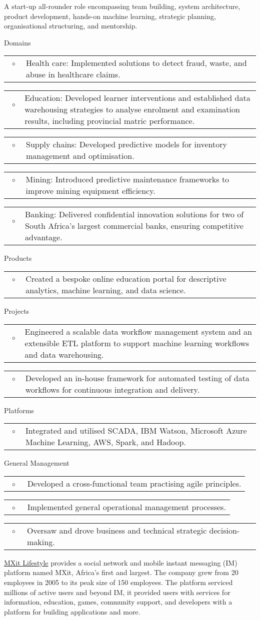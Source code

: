 \documentclass[10pt,a4paper,final]{columncv}
\makeatletter
\newcommand{\cvitembullet}[1]{%
  \begin{tabularx}{\linewidth}{@{}l@{\hspace{0.1em}}X@{}}
    ~$\circ$~ & #1 \\
  \end{tabularx}%
}
\makeatother
\begin{document}
\begin{cvenv}
         {A start-up all-rounder role encompassing team building, system architecture, product development,
          hands-on machine learning, strategic planning, organisational structuring, and mentorship.}
         {Domains
            \cvitembullet{Health care: Implemented solutions to detect fraud, waste, and abuse in healthcare claims.}
            \cvitembullet{Education: Developed learner interventions and established data warehousing strategies to analyse enrolment and examination results, including provincial matric performance.}
            \cvitembullet{Supply chains: Developed predictive models for inventory management and optimisation.}
            \cvitembullet{Mining: Introduced predictive maintenance frameworks to improve mining equipment efficiency.}
            \cvitembullet{Banking: Delivered confidential innovation solutions for two of South Africa's largest commercial banks, ensuring competitive advantage.}
          Products
            \cvitembullet{Created a bespoke online education portal for descriptive analytics, machine learning, and data science.}
          Projects
            \cvitembullet{Engineered a scalable data workflow management system and an extensible ETL platform to support machine learning workflows and data warehousing.}
            \cvitembullet{Developed an in-house framework for automated testing of data workflows for continuous integration and delivery.}
          Platforms
            \cvitembullet{Integrated and utilised SCADA, IBM Watson, Microsoft Azure Machine Learning, AWS, Spark, and Hadoop.}
          General Management
            \cvitembullet{Developed a cross-functional team practising agile principles.}
            \cvitembullet{Implemented general operational management processes.}
            \cvitembullet{Oversaw and drove business and technical strategic decision-making.}
          }
\end{cvenv}

\pagebreak

\noindent \href{http://www.mxit.com/}{MXit Lifestyle} provides a social network and mobile
          instant messaging (IM) platform named MXit, Africa's first and largest. The
          company grew from 20 employees in 2005 to its peak size of 150
          employees. The platform serviced millions of active users and beyond IM,
          it provided users with services for information, education, games, community
          support, and developers with a platform for building applications and more.
\end{document}
